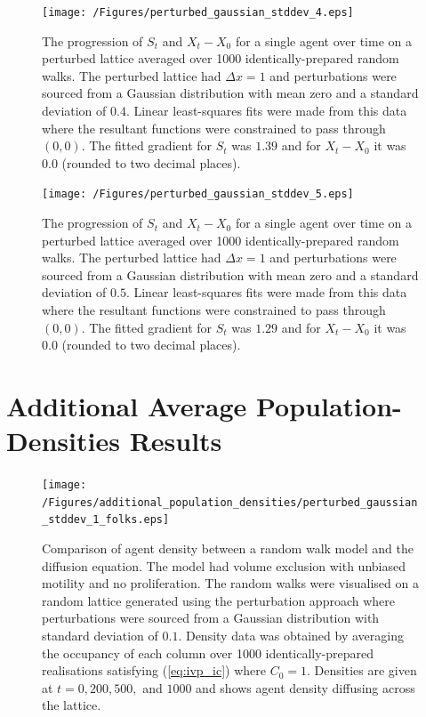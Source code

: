 \documentclass[11pt,titlepage,a4paper]{article}
\begin{document}
\begin{appendix}
		\clearpage
		\begin{figure}[tbh]
			\centering
				\texttt{[image: /Figures/perturbed\_gaussian\_stddev\_4.eps]}
			\caption{The progression of $S_t$ and $X_t - X_0$ for a single agent over time on a perturbed lattice averaged over 1000 identically-prepared random walks. The perturbed lattice had $\Delta x = 1$ and perturbations were sourced from a Gaussian distribution with mean zero and a standard deviation of $0.4$. Linear least-squares fits were made from this data where the resultant functions were constrained to pass through $(0,0)$. The fitted gradient for $S_t$ was $1.39$ and for $X_t - X_0$ it was $0.0$ (rounded to two decimal places).}
			\label{fig:perturbed_gaussian_stddev_4}
		\end{figure}

		\clearpage
		\begin{figure}[tbh]
			\centering
				\texttt{[image: /Figures/perturbed\_gaussian\_stddev\_5.eps]}
			\caption{The progression of $S_t$ and $X_t - X_0$ for a single agent over time on a perturbed lattice averaged over 1000 identically-prepared random walks. The perturbed lattice had $\Delta x = 1$ and perturbations were sourced from a Gaussian distribution with mean zero and a standard deviation of $0.5$. Linear least-squares fits were made from this data where the resultant functions were constrained to pass through $(0,0)$. The fitted gradient for $S_t$ was $1.29$ and for $X_t - X_0$ it was $0.0$ (rounded to two decimal places).}
			\label{fig:perturbed_gaussian_stddev_5}
		\end{figure}

	\pagebreak
	\section{Additional Average Population-Densities Results}
	\label{appendix:populationdensities}
	\setcounter{figure}{0}

		\begin{figure}[tbh]
			\centering
				\texttt{[image: /Figures/additional\_population\_densities/perturbed\_gaussian\_stddev\_1\_folks.eps]}
			\caption{Comparison of agent density between a random walk model and the diffusion equation. The model had volume exclusion with unbiased motility and no proliferation. The random walks were visualised on a random lattice generated using the perturbation approach where perturbations were sourced from a Gaussian distribution with standard deviation of $0.1$. Density data was obtained by averaging the occupancy of each column over 1000 identically-prepared realisations satisfying (\ref{eq:ivp_ic}) where $C_0 = 1$. Densities are given at $t = 0, 200, 500,$ and $1000$ and shows agent density diffusing across the lattice.}
			\label{fig:perturbed_gaussian_stddev_1_folks}
		\end{figure}


\end{appendix}
\end{document}
